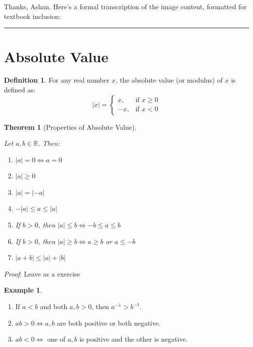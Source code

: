\documentclass[
]{book}
\providecommand{\tightlist}{%
  \setlength{\itemsep}{0pt}\setlength{\parskip}{0pt}}
\newtheorem{theorem}{Theorem}[chapter]
\theoremstyle{definition}
\newtheorem{definition}{Definition}[chapter]
\theoremstyle{definition}
\newtheorem{example}{Example}[chapter]
\theoremstyle{definition}
\theoremstyle{definition}
\theoremstyle{remark}
\begin{document}
Thanks, Ashan. Here's a formal transcription of the image content, formatted for textbook inclusion:

\begin{center}\rule{0.5\linewidth}{0.5pt}\end{center}

\section{Absolute Value}\label{absolute-value}

\begin{definition}
\protect\hypertarget{def:unnamed-chunk-101}{}\label{def:unnamed-chunk-101}For any real number \(x\), the absolute value (or modulus) of \(x\) is defined as:
\[
|x| = 
\begin{cases}
x, & \text{if } x \geq 0 \\
-x, & \text{if } x < 0
\end{cases}
\]
\end{definition}

\begin{theorem}[Properties of Absolute Value]
\protect\hypertarget{thm:unnamed-chunk-102}{}\label{thm:unnamed-chunk-102}

Let \(a, b \in \mathbb{R}\). Then:

\begin{enumerate}
\def\labelenumi{\arabic{enumi}.}
\tightlist
\item
  \(|a| = 0 \iff a = 0\)
\item
  \(|a| \geq 0\)
\item
  \(|a| = |-a|\)
\item
  \(-|a| \leq a \leq |a|\)
\item
  If \(b > 0\), then \(|a| \leq b \iff -b \leq a \leq b\)
\item
  If \(b > 0\), then \(|a| \geq b \iff a \geq b\) or \(a \leq -b\)
\item
  \(|a + b| \leq |a| + |b|\)
\end{enumerate}

\end{theorem}

\emph{Proof}: Leave as a exercise

\begin{example}
\protect\hypertarget{exm:unnamed-chunk-103}{}\label{exm:unnamed-chunk-103}\leavevmode

\begin{enumerate}
\def\labelenumi{\arabic{enumi}.}
\tightlist
\item
  If \(a < b\) and both \(a, b > 0\), then \(a^{-1} > b^{-1}\).
\item
  \(ab > 0 \iff a, b\) are both positive or both negative.
\item
  \(ab < 0 \iff\) one of \(a, b\) is positive and the other is negative.
\end{enumerate}

\end{example}
\end{document}
